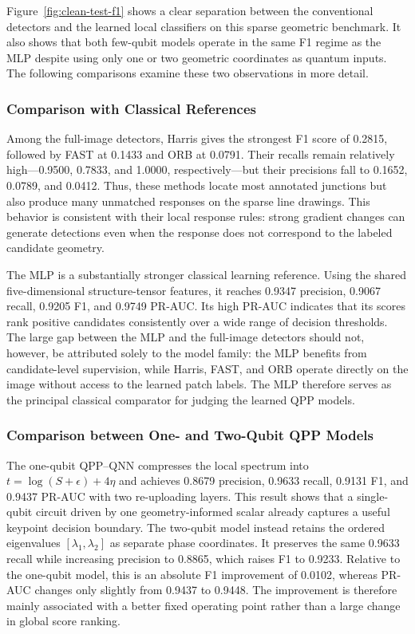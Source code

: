 \documentclass[11pt]{article}
\begin{document}
Figure~\ref{fig:clean-test-f1} shows a clear separation between the conventional
detectors and the learned local classifiers on this sparse geometric benchmark.
It also shows that both few-qubit models operate in the same F1 regime as the
MLP despite using only one or two geometric coordinates as quantum inputs.
The following comparisons examine these two observations in more detail.

\subsubsection{Comparison with Classical References}

Among the full-image detectors, Harris gives the strongest F1 score of 0.2815,
followed by FAST at 0.1433 and ORB at 0.0791. Their recalls remain relatively
high---0.9500, 0.7833, and 1.0000, respectively---but their precisions fall to
0.1652, 0.0789, and 0.0412. Thus, these methods locate most annotated
junctions but also produce many unmatched responses on the sparse line
drawings. This behavior is consistent with their local response rules: strong
gradient changes can generate detections even when the response does not
correspond to the labeled candidate geometry.

The MLP is a substantially stronger classical learning reference. Using the
shared five-dimensional structure-tensor features, it reaches 0.9347 precision,
0.9067 recall, 0.9205 F1, and 0.9749 PR-AUC. Its high PR-AUC indicates that its
scores rank positive candidates consistently over a wide range of decision
thresholds. The large gap between the MLP and the full-image detectors should
not, however, be attributed solely to the model family: the MLP benefits from
candidate-level supervision, while Harris, FAST, and ORB operate directly on
the image without access to the learned patch labels. The MLP therefore serves
as the principal classical comparator for judging the learned QPP models.

\subsubsection{Comparison between One- and Two-Qubit QPP Models}

The one-qubit QPP--QNN compresses the local spectrum into
$t=\log(S+\epsilon)+4\eta$ and achieves 0.8679 precision, 0.9633 recall,
0.9131 F1, and 0.9437 PR-AUC with two re-uploading layers. This result shows
that a single-qubit circuit driven by one geometry-informed scalar already
captures a useful keypoint decision boundary. The two-qubit model instead
retains the ordered eigenvalues $[\lambda_1,\lambda_2]$ as separate phase
coordinates. It preserves the same 0.9633 recall while increasing precision to
0.8865, which raises F1 to 0.9233. Relative to the one-qubit model, this is an
absolute F1 improvement of 0.0102, whereas PR-AUC changes only slightly from
0.9437 to 0.9448. The improvement is therefore mainly associated with a better
fixed operating point rather than a large change in global score ranking.
\end{document}
